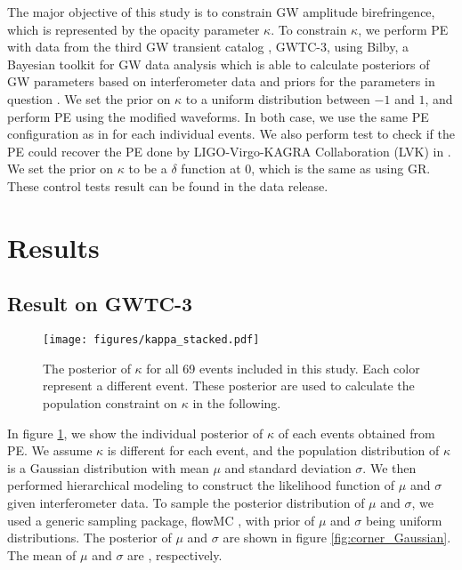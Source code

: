 \documentclass[aps,prd,twocolumn,superscriptaddress,preprintnumbers,floatfix,nofootinbib]{revtex4-2}
\begin{document}
The major objective of this study is to constrain GW amplitude birefringence, which is represented by the opacity parameter $\kappa$.
To constrain $\kappa$, we perform PE with data from the third GW transient catalog \citep{GWTC-2.1, GWTC-3}, GWTC-3, using Bilby, a Bayesian toolkit for GW data analysis which is able to calculate posteriors of GW parameters based on interferometer data and priors for the parameters in question \citep{Bilby}. 
We set the prior on $\kappa$ to a uniform distribution between $-1$ and $1$, and perform PE using the modified waveforms.
In both case, we use the same PE configuration as in \citet{GWTC-2.1, GWTC-3} for each individual events.
We also perform test to check if the PE could recover the PE done by LIGO-Virgo-KAGRA Collaboration (LVK) in \citet{GWTC-2.1, GWTC-3}.
We set the prior on $\kappa$ to be a $\delta$ function at $0$, which is the same as using GR.
These control tests result can be found in the data release.

\section{Results}
\label{sec:Results}
\subsection{Result on GWTC-3}
\begin{figure}[h]
    \texttt{[image: figures/kappa\_stacked.pdf]}
    \caption{
        The posterior of $\kappa$ for all 69 events included in this study.
        Each color represent a different event.
        These posterior are used to calculate the population constraint on $\kappa$ in the following.
    }
    \label{fig:kappa_stacked}
\end{figure}

In figure \ref{fig:kappa_stacked}, we show the individual posterior of $\kappa$ of each events obtained from PE.
We assume $\kappa$ is different for each event, and the population distribution of $\kappa$ is a Gaussian distribution with mean $\mu$ and standard deviation $\sigma$.
We then performed hierarchical modeling to construct the likelihood function of $\mu$ and $\sigma$ given interferometer data.
To sample the posterior distribution of $\mu$ and $\sigma$, we used a generic sampling package, flowMC \citep{flowMC}, with prior of $\mu$ and $\sigma$ being uniform distributions.
The posterior of $\mu$ and $\sigma$ are shown in figure \ref{fig:corner_Gaussian}.
The mean of $\mu$ and $\sigma$ are , respectively.
\end{document}
